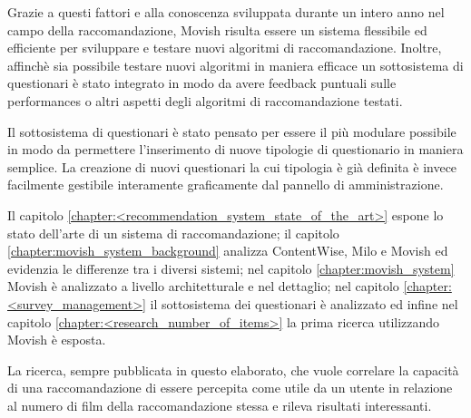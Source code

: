 Grazie a questi fattori e alla conoscenza sviluppata durante un intero anno nel campo della raccomandazione, Movish risulta essere un sistema flessibile ed efficiente per sviluppare e testare nuovi algoritmi di raccomandazione. Inoltre, affinch\`e sia possibile testare nuovi algoritmi in maniera efficace un sottosistema di questionari \`e stato integrato in modo da avere feedback puntuali sulle performances o altri aspetti degli algoritmi di raccomandazione testati.

Il sottosistema di questionari \`e stato pensato per essere il pi\`u modulare possibile in modo da permettere l'inserimento di nuove tipologie di questionario in maniera semplice. La creazione di nuovi questionari la cui tipologia \`e gi\`a definita \`e invece facilmente gestibile interamente graficamente dal pannello di amministrazione.

Il capitolo \ref{chapter:<recommendation_system_state_of_the_art>} espone lo stato dell'arte di un sistema di raccomandazione; il capitolo \ref{chapter:movish_system_background} analizza ContentWise, Milo e Movish ed evidenzia le differenze tra i diversi sistemi; nel capitolo \ref{chapter:movish_system} Movish \`e analizzato a livello architetturale e nel dettaglio; nel capitolo \ref{chapter:<survey_management>} il sottosistema dei questionari \`e analizzato ed infine nel capitolo \ref{chapter:<research_number_of_items>} la prima ricerca utilizzando Movish \`e esposta. 
 
La ricerca, sempre pubblicata in questo elaborato, che vuole correlare la capacità di una raccomandazione di essere percepita come utile da un utente in relazione al numero di film della raccomandazione stessa e rileva risultati interessanti.

\acresetall